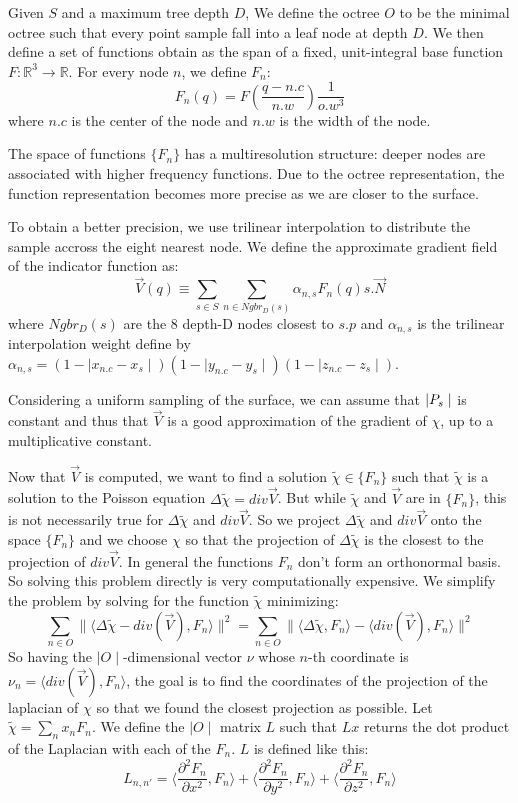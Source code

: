 \documentclass[a4paper]{article}
\begin{document}
Given $S$ and a maximum tree depth $D$, We define the octree $O$ to be the minimal octree such that every point sample fall into a leaf node at depth $D$. We then define a set of functions obtain as the span of a fixed, unit-integral base function $F: \mathbb{R}^3 \to \mathbb{R}$. For every node $n$, we define $F_n$:
$$F_n(q) = F(\frac{q - n.c}{n.w})\frac{1}{o.w^3}$$
where $n.c$ is the center of the node and $n.w$ is the width of the node.

The space of functions $\{F_n\}$ has a multiresolution structure: deeper nodes are associated with higher frequency functions. Due to the octree representation, the function representation becomes more precise as we are closer to the surface.


To obtain a better precision, we use trilinear interpolation to distribute the sample accross the eight nearest node. We define the approximate gradient field of the indicator function as:
$$\vec{V}(q) \equiv \sum_{s \in S} \sum_{n \in Ngbr_D(s)} \alpha_{n,s}F_n(q)s.\vec{N}$$
where $Ngbr_D(s)$ are the 8 depth-D nodes closest to $s.p$ and $\alpha_{n,s}$ is the trilinear interpolation weight define by $\alpha_{n,s} = (1 - \mid{}x_{n.c} - x_s \mid)(1 - \mid y_{n.c} - y_s\mid)(1 - \mid z_{n.c} - z_s\mid)$.

Considering a uniform sampling of the surface, we can assume that $\\|P_s\mid$ is constant and thus that $\vec{V}$ is a good approximation of the gradient of $\chi$, up to a multiplicative constant.

Now that $\vec{V}$ is computed, we want to find a solution $\tilde{\chi} \in \{F_n\}$ such that $\tilde{\chi}$ is a solution to the Poisson equation $\Delta\tilde{\chi} = div{\vec{V}}$. But while $\tilde{\chi}$ and $\vec{V}$ are in $\{F_n\}$, this is not necessarily true for $\Delta\tilde{\chi}$ and $div{\vec{V}}$. So we project $\Delta\tilde{\chi}$ and $div{\vec{V}}$ onto the space $\{F_n\}$ and we choose $\chi$ so that the projection of $\Delta\tilde{\chi}$ is the closest to the projection of $div{\vec{V}}$. In general the functions $F_n$ don't form an orthonormal basis. So solving this problem directly is very computationally expensive. We simplify the problem by solving for the function $\tilde{\chi}$ minimizing:
$$\sum_{n \in O}\|\langle\Delta\tilde{\chi}-div(\vec{V}),F_n\rangle\|^2 = \sum_{n \in O}\|\langle\Delta\tilde{\chi},F_n\rangle - \langle div(\vec{V}), F_n\rangle\|^2$$
So having the $\mid O \mid$-dimensional vector $\nu$ whose $n$-th coordinate is $\nu_n = \langle div(\vec{V}), F_n\rangle$, the goal is to find the coordinates of the projection of the laplacian of $\chi$ so that we found the closest projection as possible. Let $\tilde{\chi} = \sum_n x_n F_n$. We define the $\mid O \mid$ matrix $L$ such that $Lx$ returns the dot product of the Laplacian with each of the $F_n$. $L$ is defined like this:
$$L_{n,n'} = \langle\frac{\partial^2F_n}{\partial x^2}, F_n\rangle + \langle\frac{\partial^2F_n}{\partial y^2}, F_n\rangle + \langle\frac{\partial^2F_n}{\partial z^2}, F_n\rangle$$ 
\end{document}
